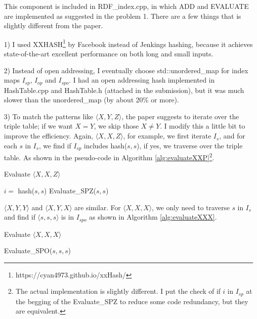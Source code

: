 \documentclass{article}
\begin{document}
\begin{enumerate}
\begin{enumerate}
This component is included in RDF\_index.cpp, in which ADD and EVALUATE are implemented as suggested in the problem 1. There are a few things that is slightly different from the paper. 

1) I used XXHASH\footnote{https://cyan4973.github.io/xxHash/} by Facebook instead of Jenkings hashing, because it achieves state-of-the-art excellent performance on both long and small inputs. 

2) Instead of open addressing, I eventually choose std::unordered\_map for index maps $I_{sp}$, $I_{op}$ and $I_{spo}$. I had an open addressing hash implemented in HashTable.cpp and HashTable.h (attached in the submission), but it was much slower than the unordered\_map (by about 20\% or more).

3) To match the patterns like $\langle X, Y, Z\rangle$, the paper suggests to iterate over the triple table; if we want $X = Y$,  we skip those $X\neq Y$. I modify this a little bit to improve the efficiency. Again, $\langle X, X, Z\rangle$, for example, we first iterate $I_s$, and for each $s$ in $I_s$, we find if $I_{sp}$ includes hash($s, s$), if yes, we traverse over the triple table. As shown in the pseudo-code in Algorithm \eqref{alg:evaluateXXP}\footnote{The actual implementation is slightly different. I put the check of if $i$ in $I_{sp}$ at the begging of the Evaluate\_SPZ to reduce some code redundancy, but they are equivalent.}.

\begin{algorithm}[H]
\caption{Evaluate $\langle X, X, Z\rangle$}\label{alg:evaluateXXP}
\begin{algorithmic}
\State $i = $ hash($s, s$)
\State Evaluate\_SPZ($s, s$)
\EndIf
\EndFor
\end{algorithmic}
\end{algorithm}

$\langle X, Y, Y\rangle$ and $\langle X, Y, X\rangle$ are similar. For $\langle X, X, X\rangle$, we only need to traverse  $s$ in $I_s$ and find if $\langle s, s, s\rangle$ is in $I_{spo}$ as shown in  Algorithm \eqref{alg:evaluateXXX}.

\begin{algorithm}[H]
\caption{Evaluate $\langle X, X, X\rangle$}\label{alg:evaluateXXX}
\begin{algorithmic}
\State Evaluate\_SPO($s, s, s$) 
\EndFor
\end{algorithmic}
\end{algorithm}


\end{enumerate}
\end{enumerate}
\end{document}
